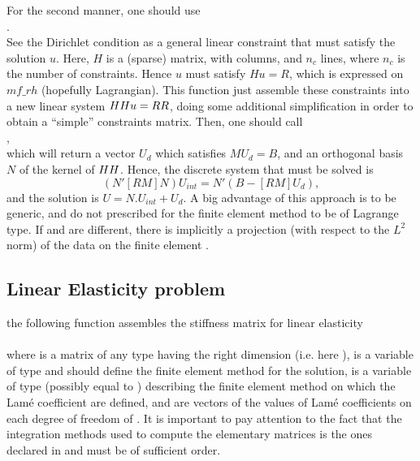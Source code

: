 \documentclass[11pt,a4paper]{article}
\begin{document}
For the second manner, one should use\\[0.5cm]
.\\[0.5cm]
See the Dirichlet condition as a general linear constraint that must
satisfy the solution $u$. Here, $H$ is a (sparse) matrix, with  columns, and $n_c$ lines, where $n_c$ is the number
of constraints. Hence $u$ must satisfy $Hu=R$, which is expressed on
$mf\_rh$ (hopefully Lagrangian). This function just assemble these
constraints into a new linear system $HH u=RR$, doing some
additional simplification in order to obtain a ``simple'' constraints
matrix.   Then, one should
call \\[0.5cm],\\[0.5cm] which will return a vector $U_d$ which
satisfies $MU_d=B$, and an orthogonal basis $N$ of the kernel of
$HH$. Hence, the discrete system that must be solved is
\begin{equation*} (N'[RM]N) U_{int}=N'(B-[RM]U_d),\end{equation*}
and the solution is $U=N.U_{int}+U_d$.
A big advantage of this approach is to be generic, and do not prescribed for the finite element method  to be of Lagrange type. If  and 
 are different, there is implicitly a projection (with respect to the $L^2$ norm) of the data on the finite element .

\subsection{Linear Elasticity problem}

the following function assembles the stiffness matrix for linear elasticity\\[0.5cm]
 \\[0.5cm]
where  is a matrix of any type having the right dimension (i.e. here ),  is a variable of type  and should define the finite element method for the solution,   is a variable of type  (possibly equal to ) describing the finite element method on which the Lam{\'e} coefficient are defined,  and  are vectors of the values of Lam{\'e} coefficients on each degree of freedom of . It is important to pay attention to the fact that the integration methods used to compute the elementary matrices is the ones declared in  and must be of sufficient order.\\[0.5cm]
\end{document}
